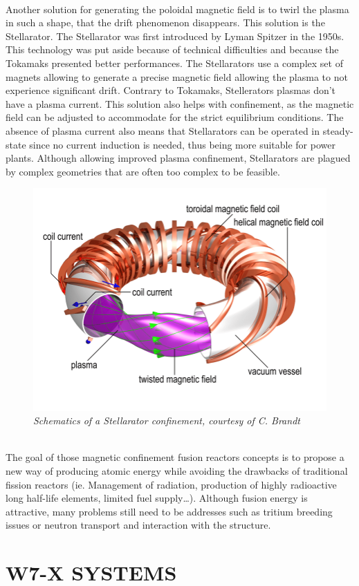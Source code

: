 \\
\break
\normalsize{\indent Another solution for generating the poloidal magnetic field is to twirl the plasma in such a shape, that the drift phenomenon disappears. This solution is the Stellarator. The Stellarator was first introduced by Lyman Spitzer in the 1950s. This technology was put aside because of technical difficulties and because the Tokamaks presented better performances. The Stellarators use a complex set of magnets allowing to generate a precise magnetic field allowing the plasma to not experience significant drift. Contrary to Tokamaks, Stellerators plasmas don’t have a plasma current. This solution also helps with confinement, as the magnetic field can be adjusted to accommodate for the strict equilibrium conditions. The absence of plasma current also means that Stellarators can be operated in steady-state since no current induction is needed, thus being more suitable for power plants. Although allowing improved plasma confinement, Stellarators are plagued by complex geometries that are often too complex to be feasible.}
\begin{figure}[h!]
    \centering
    \includegraphics[width=.6\textwidth]{figures/fig_3.png}
    \caption{\it Schematics of a Stellarator confinement, courtesy of C. Brandt}
\end{figure}
\\
\normalsize{\indent The goal of those magnetic confinement fusion reactors concepts is to propose a new way of producing atomic energy while avoiding the drawbacks of traditional fission reactors (ie. Management of radiation, production of highly radioactive long half-life elements, limited fuel supply…). Although fusion energy is attractive, many problems still need to be addresses such as tritium breeding issues or neutron transport and interaction with the structure.}
\section{W7-X SYSTEMS}

